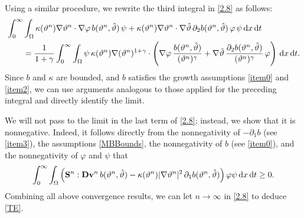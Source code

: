 \documentclass[11pt, a4paper, reqno]{amsart}
\numberwithin{equation}{section}
\newcommand{\thetah}{\hat\thet}
\newcommand{\vc}[1]{{\bf #1}}
\newcommand{\vv}{\vc{v}}
\newcommand{\thet}{\vartheta}
\renewcommand{\S}{\mathbf{S}}
\newcommand{\D}{\mathbf{D}}
\newcommand{\dt}{\,{\rm d} t }
\newcommand{\dx}{\,{\rm d} {x}}
\newcommand{\intnO}[1]{\int_0^{\infty}\intO{ #1 }\dt}
\newcommand{\intO}[1]{\int_{\Omega} #1 \dx}
\newcommand{\bb}{b}
\begin{document}
Using a similar procedure, we rewrite the third integral in \eqref{2.8} as follows:
$$
\begin{aligned}
&\intnO{\kappa(\thet^n)\nabla\thet^{n}\cdot \nabla \varphi\, \bb(\thet^n, \thetah)\,\psi 
+ \kappa(\thet^n)\nabla\thet^{n}\cdot\nabla\thetah \,\partial_{2} \bb(\thet^n, \thetah)\,\varphi \,\psi} \\
&\qquad = \frac{1}{1+\gamma}\intnO{\psi \,\kappa(\thet^n)\nabla (\thet^{n})^{1+\gamma} \cdot 
\left(\nabla \varphi\, \frac{\bb(\thet^n, \thetah)}{(\thet^n)^{\gamma}} 
+ \nabla\thetah \, \frac{\partial_{2}\bb(\thet^n, \thetah)}{(\thet^n)^{\gamma}}\,\varphi \right)}.
\end{aligned}
$$
Since $\bb$ and $\kappa$ are bounded, and $\bb$ satisfies the growth assumptions \eqref{item0} and \eqref{item2}, we can use arguments analogous to those applied for the preceding integral and directly identify the limit. 

We will not pass to the limit in the last term of \eqref{2.8}; instead, we show that it is nonnegative. Indeed, it follows directly from the nonnegativity of $-\partial_1 b$ (see \eqref{item3}), the assumptions \eqref{MBBounds}, the nonnegativity of $b$ (see \eqref{item0}), and the nonnegativity of $\varphi$ and $\psi$ that
$$
\intnO{\left(\S^{n}: \D\vv^{n} \,\bb(\thet^n, \thetah) 
- \kappa(\thet^n)|\nabla\thet^{n}|^2 \,\partial_1\bb(\thet^n, \thetah)\right) \varphi \psi} \ge 0.
$$
Combining all above convergence results, we can let $n\to \infty$ in \eqref{2.8} to deduce \eqref{TE}.

\end{document}
